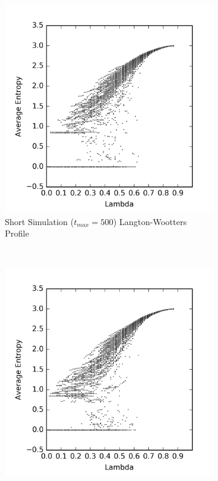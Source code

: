 \documentclass[a4paper,11pt]{report}
\begin{document}
\begin{figure}[htp]
\centering
  \begin{subfigure}[t]{0.6\textwidth}
  \includegraphics[width=\textwidth]{ch6_figs/reg_entropy_500_scatter}
  \caption{Short Simulation ($t_{max} = 500$) Langton-Wootters Profile}
  \label{fig:lw_profile_short}
  \end{subfigure}
  ~
  \begin{subfigure}[t]{0.6\textwidth}
  \centering
  \includegraphics[width=\textwidth]{ch6_figs/reg_entropy_1000_scatter}

\end{subfigure}
\end{figure}
\end{document}
